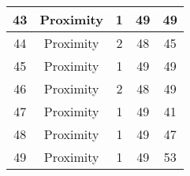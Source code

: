 \documentclass[results.tex]{subfiles}
\begin{document}
\begin{center}
\begin{tabular}{| c || c | c | c | c |}
            \hline
            43                      & Proximity                    & 1                      & 49                      & 49                   \\
            \hline
            44                      & Proximity                    & 2                      & 48                      & 45                   \\
            \hline
            45                      & Proximity                    & 1                      & 49                      & 49                   \\
            \hline
            46                      & Proximity                    & 2                      & 48                      & 49                   \\
            \hline
            47                      & Proximity                    & 1                      & 49                      & 41                   \\
            \hline
            48                      & Proximity                    & 1                      & 49                      & 47                   \\
            \hline
            49                      & Proximity                    & 1                      & 49                      & 53                   \\
            \hline
        \end{tabular}
    \end{center}
\end{document}
